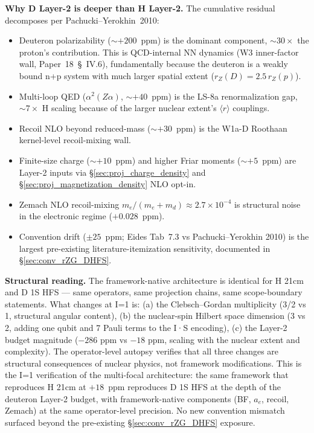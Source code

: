\documentclass[11pt]{article}
\begin{document}
\textbf{Why D Layer-2 is deeper than H Layer-2.}  The cumulative
residual decomposes per Pachucki--Yerokhin~2010:
\begin{itemize}\setlength\itemsep{0pt}
\item Deuteron polarizability ($\sim +200$~ppm) is the dominant
component, $\sim 30\times$ the proton's contribution.  This is
QCD-internal NN dynamics (W3 inner-factor wall, Paper~18~\S~IV.6),
fundamentally because the deuteron is a weakly bound n+p system
with much larger spatial extent ($r_Z(D) = 2.5\,r_Z(p)$).
\item Multi-loop QED ($\alpha^2(Z\alpha)$, $\sim +40$~ppm) is the
LS-8a renormalization gap, $\sim 7\times$ H scaling because of the
larger nuclear extent's $\langle r\rangle$ couplings.
\item Recoil NLO beyond reduced-mass ($\sim +30$~ppm) is the W1a-D
Roothaan kernel-level recoil-mixing wall.
\item Finite-size charge ($\sim +10$~ppm) and higher Friar moments
($\sim +5$~ppm) are Layer-2 inputs via \S\ref{sec:proj_charge_density}
and \S\ref{sec:proj_magnetization_density} NLO opt-in.
\item Zemach NLO recoil-mixing $m_e/(m_e+m_d) \approx 2.7 \times 10^{-4}$
is structural noise in the electronic regime ($+0.028$~ppm).
\item Convention drift ($\pm 25$~ppm; Eides Tab~7.3 vs Pachucki--Yerokhin
2010) is the largest pre-existing literature-itemization
sensitivity, documented in \S\ref{sec:conv_rZG_DHFS}.
\end{itemize}

\textbf{Structural reading.}  The framework-native architecture is
identical for H 21cm and D 1S HFS --- same operators, same projection
chains, same scope-boundary statements.  What changes at I=1 is:
(a) the Clebsch--Gordan multiplicity (3/2 vs 1, structural angular
content), (b) the nuclear-spin Hilbert space dimension (3 vs 2,
adding one qubit and 7 Pauli terms to the I·S encoding), (c) the
Layer-2 budget magnitude ($-286$ ppm vs $-18$ ppm, scaling with the
nuclear extent and complexity).  The operator-level autopsy verifies
that all three changes are structural consequences of nuclear physics,
not framework modifications.  This is the I=1 verification of the
multi-focal architecture: the same framework that reproduces H 21cm
at $+18$~ppm reproduces D 1S HFS at the depth of the deuteron Layer-2
budget, with framework-native components (BF, $a_e$, recoil, Zemach)
at the same operator-level precision.  No new convention mismatch
surfaced beyond the pre-existing \S\ref{sec:conv_rZG_DHFS} exposure.
\end{document}
